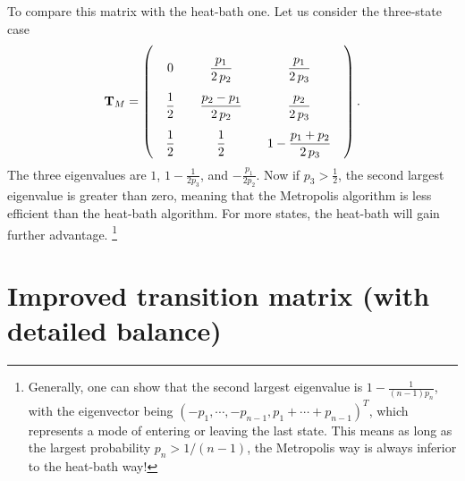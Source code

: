 \documentclass[12pt]{article}
\begin{document}
To compare this matrix with the heat-bath one.
Let us consider the three-state case
$$
\mathbf T_M =
\left(
  \arraycolsep=10.0pt\def\arraystretch{2.5}
  \begin{array}{cccccc}
    0   & \dfrac{p_1}{2 \, p_2} & \dfrac{p_1}{2 \, p_3} \\
    \dfrac{1}{2} & \dfrac{p_2-p_1}{2 \, p_2} & \dfrac{p_2}{2 \, p_3} \\
    \dfrac{1}{2} & \dfrac{1}{2} & 1 - \dfrac{p_1 + p_{2}}{2 \, p_3}
  \end{array}
\right).
$$
The three eigenvalues are
$1$, $1 - \frac{1}{2 p_3}$, and $-\frac{p_1}{2 p_2}$.
%
Now if $p_3 > \frac{1}{2}$, the second largest eigenvalue
is greater than zero, meaning that the Metropolis algorithm
is less efficient than the heat-bath algorithm.
For more states, the heat-bath will gain further advantage.
\footnote{
Generally, one can show that
the second largest eigenvalue is $1- \frac{1}{(n-1)p_n}$,
with the eigenvector being
$(-p_1, \cdots, -p_{n-1}, p_1 + \cdots + p_{n-1})^T$,
which represents a mode of entering or leaving the last state.
This means as long as the largest probability $p_n > 1/(n-1)$,
the Metropolis way is always inferior to the heat-bath way!
}



\section{Improved transition matrix (with detailed balance)}
\end{document}
